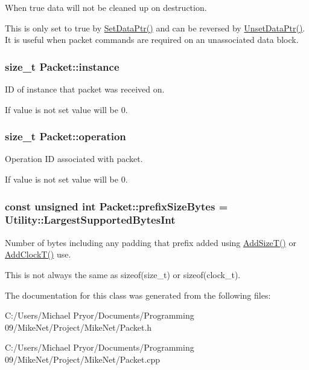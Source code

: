 When true data will not be cleaned up on destruction. 

This is only set to true by \hyperlink{class_packet_a38192749e78469e015c2234fa5f3fed9}{SetDataPtr()} and can be reversed by \hyperlink{class_packet_aec0d1088b95c8a2daa6a12affc28b2d9}{UnsetDataPtr()}. It is useful when packet commands are required on an unassociated data block. \hypertarget{class_packet_afce0ae0cb900f81df3cb1aaa2d197495}{
\subsubsection[{instance}]{\setlength{\rightskip}{0pt plus 5cm}size\_\-t {\bf Packet::instance}}}
\label{class_packet_afce0ae0cb900f81df3cb1aaa2d197495}


ID of instance that packet was received on. 

If value is not set value will be 0. \hypertarget{class_packet_a03920d292b5acc0f9223f6364d663001}{
\subsubsection[{operation}]{\setlength{\rightskip}{0pt plus 5cm}size\_\-t {\bf Packet::operation}}}
\label{class_packet_a03920d292b5acc0f9223f6364d663001}


Operation ID associated with packet. 

If value is not set value will be 0. \hypertarget{class_packet_a42ceeb49399f078bf848896bef2fa529}{
\subsubsection[{prefixSizeBytes}]{\setlength{\rightskip}{0pt plus 5cm}const unsigned int {\bf Packet::prefixSizeBytes} = {\bf Utility::LargestSupportedBytesInt}}}
\label{class_packet_a42ceeb49399f078bf848896bef2fa529}


Number of bytes including any padding that prefix added using \hyperlink{class_packet_a35b1fc5b107629dfc63dd0d9382cfb03}{AddSizeT()} or \hyperlink{class_packet_a60b85220c73a9474bfe17cb0e5d00771}{AddClockT()} use. 

This is not always the same as sizeof(size\_\-t) or sizeof(clock\_\-t). 

The documentation for this class was generated from the following files:\begin{DoxyCompactItemize}
\item 
C:/Users/Michael Pryor/Documents/Programming 09/MikeNet/Project/MikeNet/Packet.h\item 
C:/Users/Michael Pryor/Documents/Programming 09/MikeNet/Project/MikeNet/Packet.cpp\end{DoxyCompactItemize}
